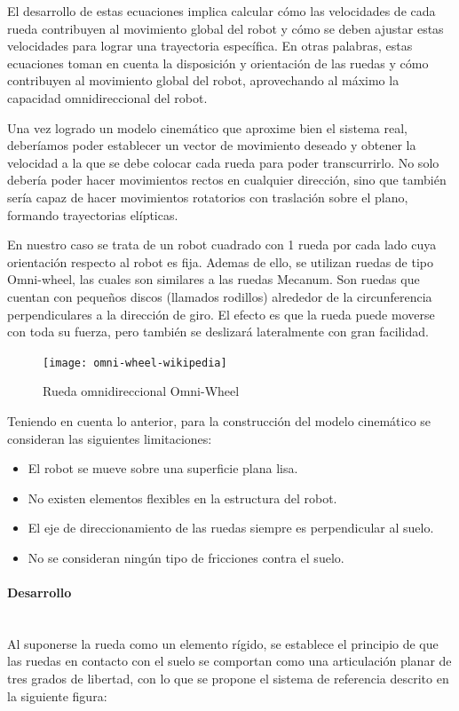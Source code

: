El desarrollo de estas ecuaciones implica calcular cómo las velocidades de cada rueda contribuyen al movimiento global del robot y cómo se deben ajustar estas velocidades para lograr una trayectoria específica. En otras palabras, estas ecuaciones toman en cuenta la disposición y orientación de las ruedas y cómo contribuyen al movimiento global del robot, aprovechando al máximo la capacidad omnidireccional del robot.

Una vez logrado un modelo cinemático que aproxime bien el sistema real, deberíamos poder establecer un vector de movimiento deseado y obtener la velocidad a la que se debe colocar cada rueda para poder transcurrirlo. No solo debería poder hacer movimientos rectos en cualquier dirección, sino que también sería capaz de hacer movimientos rotatorios con traslación sobre el plano, formando trayectorias elípticas. \cite{rijalusalamkinematics}

En nuestro caso se trata de un robot cuadrado con 1 rueda por cada lado cuya orientación respecto al robot es fija. Ademas de ello, se utilizan ruedas de tipo Omni-wheel, las cuales son similares a las ruedas Mecanum. Son ruedas que cuentan con pequeños discos (llamados rodillos) alrededor de la circunferencia perpendiculares a la dirección de giro. El efecto es que la rueda puede moverse con toda su fuerza, pero también se deslizará lateralmente con gran facilidad.

\begin{figure}[H]
    \centering
    \texttt{[image: omni-wheel-wikipedia]}
    \caption{Rueda omnidireccional Omni-Wheel}
    \label{fig:ruedaomniwheel}
\end{figure}

Teniendo en cuenta lo anterior, para la construcción del modelo cinemático se consideran las siguientes limitaciones:

\begin{itemize}
    \item El robot se mueve sobre una superficie plana lisa.
    \item No existen elementos flexibles en la estructura del robot.
    \item El eje de direccionamiento de las ruedas siempre es perpendicular al suelo.
    \item No se consideran ningún tipo de fricciones contra el suelo.
\end{itemize}

\paragraph{Desarrollo} \mbox{} \vspace{8pt} \\
Al suponerse la rueda como un elemento rígido, se establece el principio de que las ruedas en contacto con el suelo se comportan como una articulación planar de tres grados de libertad, con lo que se propone el sistema de referencia descrito en la siguiente figura:

